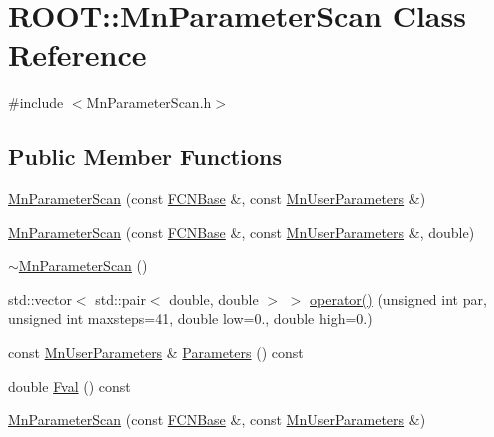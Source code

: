 \hypertarget{classROOT_1_1Minuit2_1_1MnParameterScan}{}\section{R\+O\+OT\+:\+:Mn\+Parameter\+Scan Class Reference}
\label{classROOT_1_1Minuit2_1_1MnParameterScan}


{\ttfamily \#include $<$Mn\+Parameter\+Scan.\+h$>$}

\subsection*{Public Member Functions}
\begin{DoxyCompactItemize}
\item 
\mbox{\hyperlink{classROOT_1_1Minuit2_1_1MnParameterScan_a74db5691c231aae4eb0291501a046ae4}{Mn\+Parameter\+Scan}} (const \mbox{\hyperlink{classROOT_1_1Minuit2_1_1FCNBase}{F\+C\+N\+Base}} \&, const \mbox{\hyperlink{classROOT_1_1Minuit2_1_1MnUserParameters}{Mn\+User\+Parameters}} \&)
\item 
\mbox{\hyperlink{classROOT_1_1Minuit2_1_1MnParameterScan_a741d7ce09e8fb56ab0f1345e8c8520c8}{Mn\+Parameter\+Scan}} (const \mbox{\hyperlink{classROOT_1_1Minuit2_1_1FCNBase}{F\+C\+N\+Base}} \&, const \mbox{\hyperlink{classROOT_1_1Minuit2_1_1MnUserParameters}{Mn\+User\+Parameters}} \&, double)
\item 
\mbox{\hyperlink{classROOT_1_1Minuit2_1_1MnParameterScan_af9a8ee2b797033783fe832ebe727ddc2}{$\sim$\+Mn\+Parameter\+Scan}} ()
\item 
std\+::vector$<$ std\+::pair$<$ double, double $>$ $>$ \mbox{\hyperlink{classROOT_1_1Minuit2_1_1MnParameterScan_a2548238382446f4774d43a4269dcebcf}{operator()}} (unsigned int par, unsigned int maxsteps=41, double low=0., double high=0.)
\item 
const \mbox{\hyperlink{classROOT_1_1Minuit2_1_1MnUserParameters}{Mn\+User\+Parameters}} \& \mbox{\hyperlink{classROOT_1_1Minuit2_1_1MnParameterScan_aacca13f3ec5fe5acd706dee93edb56d4}{Parameters}} () const
\item 
double \mbox{\hyperlink{classROOT_1_1Minuit2_1_1MnParameterScan_a7251577562ac12179ea9669e9a10bac7}{Fval}} () const
\item 
\mbox{\hyperlink{classROOT_1_1Minuit2_1_1MnParameterScan_a74db5691c231aae4eb0291501a046ae4}{Mn\+Parameter\+Scan}} (const \mbox{\hyperlink{classROOT_1_1Minuit2_1_1FCNBase}{F\+C\+N\+Base}} \&, const \mbox{\hyperlink{classROOT_1_1Minuit2_1_1MnUserParameters}{Mn\+User\+Parameters}} \&)

\end{DoxyCompactItemize}

